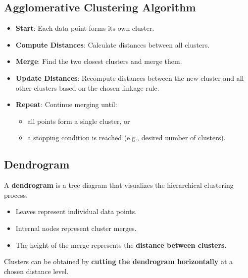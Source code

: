 \documentclass[10pt,a4paper]{article}
\begin{document}
	\subsection{Agglomerative Clustering Algorithm}

	\begin{itemize}

		\item \textbf{Start}: Each data point forms its own cluster.

		\item \textbf{Compute Distances}: Calculate distances between all clusters.

		\item \textbf{Merge}: Find the two closest clusters and merge them.

		\item \textbf{Update Distances}: Recompute distances between the new cluster and all other clusters based on the chosen linkage rule.

		\item \textbf{Repeat}: Continue merging until:

		\begin{itemize}
			\item all points form a single cluster, or
			\item a stopping condition is reached (e.g., desired number of clusters).
		\end{itemize}

	\end{itemize}

	\subsection{Dendrogram}

	A \textbf{dendrogram} is a tree diagram that visualizes the hierarchical clustering process.

	\begin{itemize}

		\item Leaves represent individual data points.
		\item Internal nodes represent cluster merges.
		\item The height of the merge represents the \textbf{distance between clusters}.

	\end{itemize}

	Clusters can be obtained by \textbf{cutting the dendrogram horizontally} at a chosen distance level.
\end{document}
